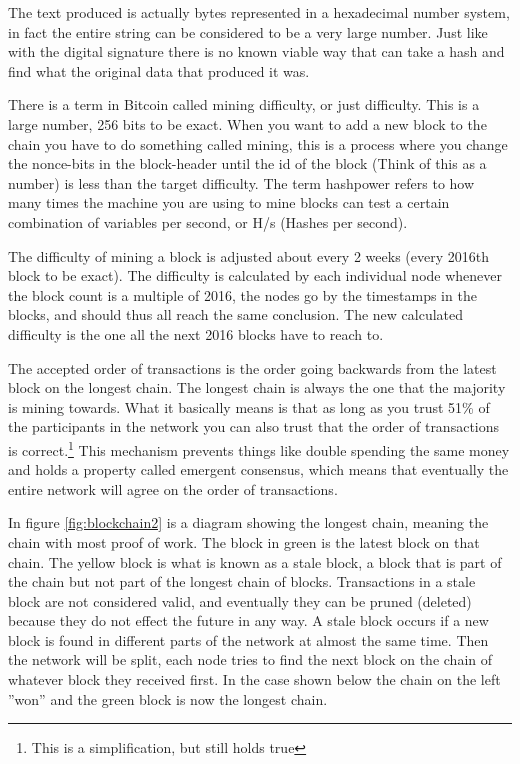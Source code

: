 The text produced is actually bytes represented in a hexadecimal number system,
in fact the entire string can be considered to be a very large number. Just like
with the digital signature there is no known viable way that can take a hash and
find what the original data that produced it was.

There is a term in Bitcoin called mining difficulty, or just difficulty. This
is a large number, 256 bits to be exact. When you want to add a new block to
the chain you have to do something called mining, this is a process where you
change the nonce-bits in the block-header until the id of the block (Think
of this as a number) is less than the target difficulty. The term hashpower refers
to how many times the machine you are using to mine blocks can test a certain
combination of variables per second, or H/s (Hashes per second).

The difficulty of mining a block is adjusted about every 2 weeks (every 2016th block to be exact). The difficulty
is calculated by each individual node whenever the block count is a multiple of 2016, the nodes go by the timestamps in the blocks, and should thus all reach the same conclusion. The new calculated difficulty is the one all the next 2016 blocks have to reach to.\cite{antonopoulos_2017}

The accepted order of transactions is the order going backwards from the latest
block on the longest chain. The longest chain is always the one that the majority
is mining towards. What it basically
means is that as long as you trust 51\% of the participants in the network you
can also trust that the order of transactions is correct.\footnote{This is a simplification, but still holds true} This mechanism
prevents things like double spending the same money and holds a property called
emergent consensus, which means that eventually the entire network will agree
on the order of transactions.

In figure \ref{fig:blockchain2} is a diagram showing the longest chain, meaning
the chain with most proof of work. The block in green is the latest block on
that chain. The yellow block is what is known as a stale block, a block that is
part of the chain but not part of the longest chain of blocks. Transactions in
a stale block are not considered valid, and eventually they can be pruned
(deleted) because they do not effect the future in any way. A stale block occurs
if a new block is found in different parts of the network at almost the same
time. Then the network will be split, each node tries to find the next block on
the chain of whatever block they received first. In the case shown below the
chain on the left ''won'' and the green block is now the longest chain.

